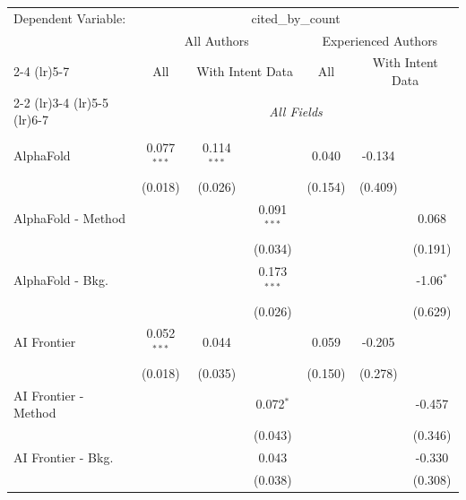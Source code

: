 \begingroup
\centering
\begin{tabular}{lcccccc}
   \tabularnewline \midrule \midrule
   Dependent Variable: & \multicolumn{6}{c}{cited\_by\_count}\\
 & \multicolumn{3}{c}{All Authors} & \multicolumn{3}{c}{Experienced Authors} \\
\cmidrule(lr){2-4} \cmidrule(lr){5-7}
 & \multicolumn{1}{c}{All} & \multicolumn{2}{c}{With Intent Data} & \multicolumn{1}{c}{All} & \multicolumn{2}{c}{With Intent Data} \\
\cmidrule(lr){2-2} \cmidrule(lr){3-4} \cmidrule(lr){5-5} \cmidrule(lr){6-7}
 & \multicolumn{6}{c}{\textit{All Fields}} \\ \\
   AlphaFold            & 0.077$^{***}$ & 0.114$^{***}$ &               & 0.040        & -0.134        &   \\   
                        & (0.018)       & (0.026)       &               & (0.154)      & (0.409)       &   \\   
   AlphaFold - Method   &               &               & 0.091$^{***}$ &              &               & 0.068\\   
                        &               &               & (0.034)       &              &               & (0.191)\\   
   AlphaFold - Bkg.     &               &               & 0.173$^{***}$ &              &               & -1.06$^{*}$\\   
                        &               &               & (0.026)       &              &               & (0.629)\\   
   AI Frontier          & 0.052$^{***}$ & 0.044         &               & 0.059        & -0.205        &   \\   
                        & (0.018)       & (0.035)       &               & (0.150)      & (0.278)       &   \\   
   AI Frontier - Method &               &               & 0.072$^{*}$   &              &               & -0.457\\   
                        &               &               & (0.043)       &              &               & (0.346)\\   
   AI Frontier - Bkg.   &               &               & 0.043         &              &               & -0.330\\   
                        &               &               & (0.038)       &              &               & (0.308)\\   

\end{tabular}
